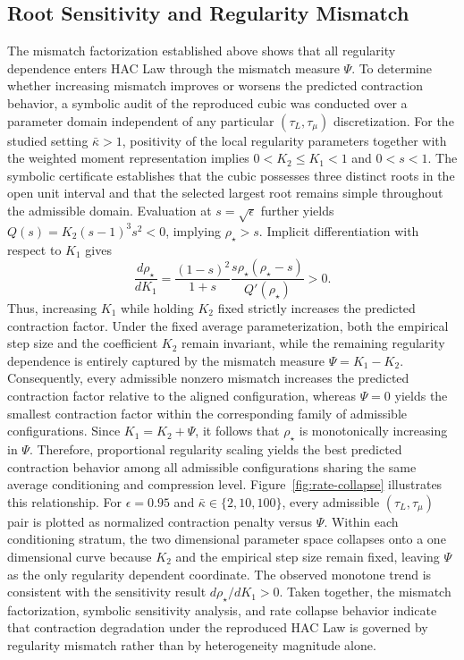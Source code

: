 \documentclass[mathematics,article,submit,moreauthors]{Definitions/mdpi}
\begin{document}
\subsection{Root Sensitivity and Regularity Mismatch} 
The mismatch factorization established above shows that all regularity dependence enters HAC Law through the mismatch measure \(\Psi\). To determine whether increasing mismatch improves or worsens the predicted contraction behavior, a symbolic audit of the reproduced cubic was conducted over a parameter domain independent of any particular \((\tau_L,\tau_\mu)\) discretization. For the studied setting \(\bar{\kappa}>1\), positivity of the local regularity parameters together with the weighted moment representation implies \(0<K_2\le K_1<1\) and \(0<s<1\). The symbolic certificate establishes that the cubic possesses three distinct roots in the open unit interval and that the selected largest root remains simple throughout the admissible domain. Evaluation at \(s=\sqrt{\epsilon}\) further yields \(Q(s)=K_2(s-1)^3s^2<0\), implying \(\rho_\star>s\). Implicit differentiation with respect to \(K_1\) gives \begin{equation} \frac{d\rho_\star}{dK_1} = \frac{(1-s)^2}{1+s} \frac{s\rho_\star(\rho_\star-s)} {Q'(\rho_\star)} >0. \end{equation} Thus, increasing \(K_1\) while holding \(K_2\) fixed strictly increases the predicted contraction factor. Under the fixed average parameterization, both the empirical step size and the coefficient \(K_2\) remain invariant, while the remaining regularity dependence is entirely captured by the mismatch measure \(\Psi=K_1-K_2\). Consequently, every admissible nonzero mismatch increases the predicted contraction factor relative to the aligned configuration, whereas \(\Psi=0\) yields the smallest contraction factor within the corresponding family of admissible configurations. Since \(K_1=K_2+\Psi\), it follows that \(\rho_\star\) is monotonically increasing in \(\Psi\). Therefore, proportional regularity scaling yields the best predicted contraction behavior among all admissible configurations sharing the same average conditioning and compression level. Figure~\ref{fig:rate-collapse} illustrates this relationship. For \(\epsilon=0.95\) and \(\bar{\kappa}\in\{2,10,100\}\), every admissible \((\tau_L,\tau_\mu)\) pair is plotted as normalized contraction penalty versus \(\Psi\). Within each conditioning stratum, the two dimensional parameter space collapses onto a one dimensional curve because \(K_2\) and the empirical step size remain fixed, leaving \(\Psi\) as the only regularity dependent coordinate. The observed monotone trend is consistent with the sensitivity result \(d\rho_\star/dK_1>0\). Taken together, the mismatch factorization, symbolic sensitivity analysis, and rate collapse behavior indicate that contraction degradation under the reproduced HAC Law is governed by regularity mismatch rather than by heterogeneity magnitude alone.
\end{document}
